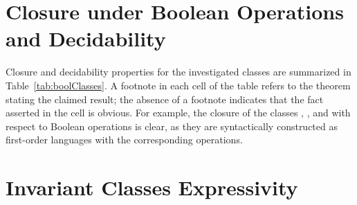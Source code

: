 \section{Closure under Boolean Operations and Decidability}\label{sec:comparison/boolean}

Closure and decidability properties for the investigated classes are summarized in Table~\cref{tab:boolClasses}. A footnote in each cell of the table refers to the theorem stating the claimed result; the absence of a footnote indicates that the fact asserted in the cell is obvious. For example, the closure of the classes \elemclass{}, \sizeelemclass{}, and \regelemclass{} with respect to Boolean operations is clear, as they are syntactically constructed as first-order languages with the corresponding operations.

\section{Invariant Classes Expressivity}\label{sec:comparison/expressivity}

